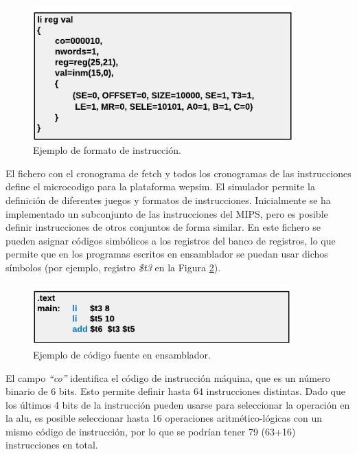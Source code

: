 \begin{figure}[htbp]
 	\centering
 	\includegraphics[width=10cm]{figures/instruction_example}
 	\caption{Ejemplo de formato de instrucción.}
	\label{fig:software_format_example}
\end{figure}

\vspace{10mm}

El fichero con el cronograma de fetch y todos los cronogramas de las instrucciones define el \gls{microcodigo} para la plataforma \acrshort{wepsim}. El simulador permite la definición de diferentes juegos y formatos de instrucciones. Inicialmente se ha implementado un subconjunto de las instrucciones del MIPS, pero es posible definir instrucciones de otros conjuntos de forma similar. En este fichero se pueden asignar códigos simbólicos a los registros del banco de registros, lo que permite que en los programas escritos en \gls{ensamblador} se puedan usar dichos  símbolos (por ejemplo, registro \emph{\$t3} en la Figura \ref{fig:software_assembly_example}).

\begin{figure}[htbp]
 	\centering
 	\includegraphics[width=10cm]{figures/example_assembly}
 	\caption{Ejemplo de código fuente en \gls{ensamblador}.}
	\label{fig:software_assembly_example}
\end{figure}

El campo \emph{``co''} identifica el código de instrucción máquina, que es un número binario de 6 bits. Esto permite definir hasta 64 instrucciones distintas. Dado que los últimos 4 bits de la instrucción pueden usarse para seleccionar la operación en la \acrshort{alu}, es posible seleccionar hasta 16 operaciones aritmético-lógicas con un mismo código de instrucción, por lo que se podrían tener 79 (63+16) instrucciones en total.

